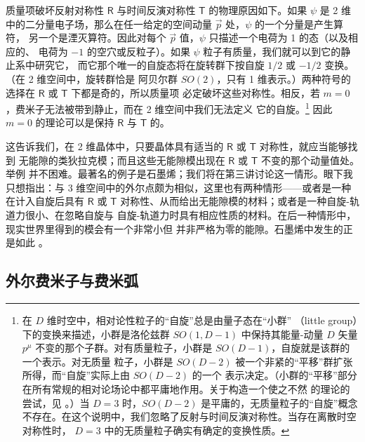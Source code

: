 \documentclass[11pt,a4paper]{article}
\numberwithin{equation}{section}
\def\sR{{\mathsf R}}
\def\sT{{\mathsf T}}
\begin{document}
质量项破坏反射对称性 $\sR$ 与时间反演对称性 $\sT$ 的物理原因如下。如果 $\psi$ 是 2
维中的二分量电子场，那么在任一给定的空间动量 $\vec p$ 处，$\psi$ 的一个分量是产生算符，
另一个是湮灭算符。因此对每个 $\vec p$ 值，$\psi$ 只描述一个电荷为 1 的态（以及相应的、
电荷为 $-1$ 的空穴或反粒子）。如果 $\psi$ 粒子有质量，我们就可以到它的静止系中研究它，
而它那个唯一的自旋态将在旋转群下按自旋 $1/2$ 或 $-1/2$ 变换。（在 2 维空间中，旋转群恰是
阿贝尔群 $SO(2)$，只有 1 维表示。）两种符号的选择在 $\sR$ 或 $\sT$ 下都是奇的，所以质量项
必定破坏这些对称性。相反，若 $m=0$，费米子无法被带到静止，而在 2 维空间中我们无法定义
它的自旋。\footnote{在 $D$ 维时空中，相对论性粒子的“自旋”总是由量子态在“小群”
（little group）下的变换来描述，小群是洛伦兹群 $SO(1,D-1)$ 中保持其能量-动量 $D$ 矢量
$p^\mu$ 不变的那个子群。对有质量粒子，小群是 $SO(D-1)$，自旋就是该群的一个表示。对无质量
粒子，小群是 $SO(D-2)$ 被一个非紧的“平移”群扩张所得，而“自旋”实际上由 $SO(D-2)$ 的一个
表示决定。（小群的“平移”部分在所有常规的相对论场论中都平庸地作用。关于构造一个使之不然
的理论的尝试，见 \cite{ST}。）当 $D=3$ 时，$SO(D-2)$ 是平庸的，无质量粒子的“自旋”概念
不存在。在这个说明中，我们忽略了反射与时间反演对称性。当存在离散时空对称性时，
$D=3$ 中的无质量粒子确实有确定的变换性质。} 因此 $m=0$ 的理论可以是保持 $\sR$ 与
$\sT$ 的。

这告诉我们，在 2 维晶体中，只要晶体具有适当的 $\sR$ 或 $\sT$ 对称性，就应当能够找到
无能隙的类狄拉克模；而且这些无能隙模出现在 $\sR$ 或 $\sT$ 不变的那个动量值处。举例
并不困难。最著名的例子是石墨烯；我们将在第三讲讨论这一情形。眼下我只想指出：与 3
维空间中的外尔点颇为相似，这里也有两种情形——或者是一种在计入自旋后具有 $\sR$ 或
$\sT$ 对称性、从而给出无能隙模的材料；或者是一种自旋-轨道力很小、在忽略自旋与
自旋-轨道力时具有相应性质的材料。在后一种情形中，现实世界里得到的模会有一个非常小但
并非严格为零的能隙。石墨烯中发生的正是如此 \cite{KM}。

\subsection{外尔费米子与费米弧}
\end{document}
